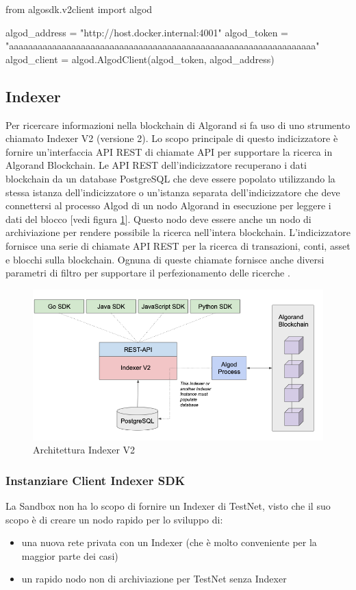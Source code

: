 \begin{pythoncode}
from algosdk.v2client import algod

algod_address = "http://host.docker.internal:4001"
algod_token = 
"aaaaaaaaaaaaaaaaaaaaaaaaaaaaaaaaaaaaaaaaaaaaaaaaaaaaaaaaaaaaaaaa"
algod_client = algod.AlgodClient(algod_token, algod_address)
\end{pythoncode}

\subsection{Indexer}
Per ricercare informazioni nella blockchain di Algorand si fa uso di uno strumento chiamato Indexer V2 (versione 2). Lo scopo principale di questo indicizzatore è fornire un'interfaccia API REST di chiamate API per supportare la ricerca in Algorand Blockchain. Le API REST dell'indicizzatore recuperano i dati blockchain da un database PostgreSQL che deve essere popolato utilizzando la stessa istanza dell'indicizzatore o un'istanza separata dell'indicizzatore che deve connettersi al processo Algod di un nodo Algorand in esecuzione per leggere i dati del blocco [vedi figura \ref{fig: indexer}]. Questo nodo deve essere anche un nodo di archiviazione per rendere possibile la ricerca nell'intera blockchain. L'indicizzatore fornisce una serie di chiamate API REST per la ricerca di transazioni, conti, asset e blocchi sulla blockchain. Ognuna di queste chiamate fornisce anche diversi parametri di filtro per supportare il perfezionamento delle ricerche \cite{algorand_indexer}.

\begin{figure}[!h]
\centering
\includegraphics[scale=0.4]{images/indexerv2.png}
\caption{Architettura Indexer V2}
\label{fig: indexer}
\end{figure}

\subsubsection{Instanziare Client Indexer SDK}
La Sandbox non ha lo scopo di fornire un Indexer di TestNet, visto che il suo scopo è di creare un nodo rapido per lo sviluppo di:
\begin{itemize}
    \item una nuova rete privata con un Indexer (che è molto conveniente per la maggior parte dei casi)
    \item un rapido nodo non di archiviazione per TestNet senza Indexer
\end{itemize}

